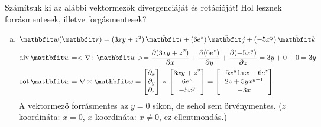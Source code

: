 \documentclass[exercise]{math-standalone}
\begin{document}
\begin{exercise}{%
    Számítsuk ki az alábbi vektormezők divergenciáját és rotációját!
    Hol lesznek forrásmentesek, illetve forgásmentesek?
  }
{\begin{enumerate}[a)]
      \item $\rvec w(\rvec r) = (3xy + z^2) \,\uvec i + (6 e^z) \,\uvec j + (-5x^y) \,\uvec k$
            \begin{align*}
              \Div \rvec w
               & = \scalar{\nabla}{\rvec w}
              = \pdv{(3xy + z^2)}{x} + \pdv{(6 e^z)}{y} + \pdv{(-5x^y)}{z}
              = 3y + 0 + 0
              = 3y
              \\
              \rot \rvec w
               & = \nabla \times \rvec w
              = \begin{bmatrix}
                  \partial_x \\ \partial_y \\ \partial_z
                \end{bmatrix} \times \begin{bmatrix}
                                       3xy + z^2 \\ 6e^z \\ -5x^y
                                     \end{bmatrix} = \begin{bmatrix}
                                                       -5 x^y \ln x - 6 e^z \\
                                                       2z + 5 y x^{y-1}     \\
                                                       -3x
                                                     \end{bmatrix}
            \end{align*}
            A vektormező forrásmentes az $y = 0$ síkon, de sehol sem
            örvénymentes. ($z$ koordináta: $x = 0$, $x$ koordináta: $x \neq 0$,
            ez ellentmondás.)
    \end{enumerate}
  }
\end{exercise}
\end{document}
